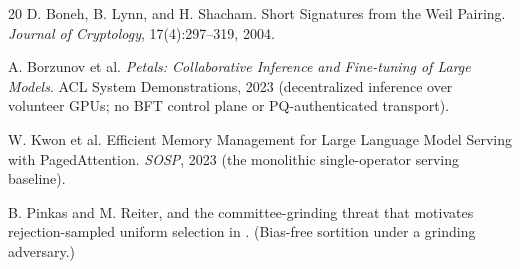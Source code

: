 \documentclass[11pt]{article}
\begin{document}
\begin{thebibliography}{20}
D. Boneh, B. Lynn, and H. Shacham. Short Signatures from the Weil Pairing. \emph{Journal of
Cryptology}, 17(4):297--319, 2004.

A. Borzunov et al. \emph{Petals: Collaborative Inference and Fine-tuning of Large Models}. ACL
System Demonstrations, 2023 (decentralized inference over volunteer GPUs; no BFT control plane or
PQ-authenticated transport).

W. Kwon et al. Efficient Memory Management for Large Language Model Serving with PagedAttention.
\emph{SOSP}, 2023 (the monolithic single-operator serving baseline).

B. Pinkas and M. Reiter, and the committee-grinding threat that motivates rejection-sampled
uniform selection in . (Bias-free sortition under a grinding adversary.)

\end{thebibliography}
\end{document}
